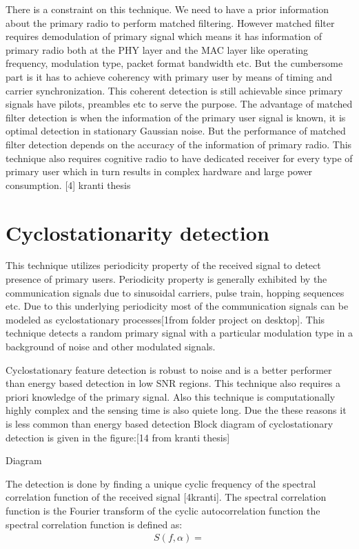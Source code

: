 There is a constraint on this technique. We need to have a prior information 
about the primary radio to perform matched filtering. However matched filter 
requires demodulation of primary signal which means it has information of 
primary radio both at the PHY layer and the MAC layer like operating frequency, 
modulation type, packet format bandwidth etc. But the cumbersome part is it has 
to achieve coherency with primary user by means of timing and carrier 
synchronization. This coherent detection is still achievable since primary 
signals have pilots, preambles etc to serve the purpose. 
The advantage of matched filter detection is when the information of the primary
user signal is known, it is optimal detection in stationary Gaussian noise. But 
the performance of matched filter detection depends on the accuracy of the 
information of primary radio. This technique also requires cognitive radio to 
have dedicated receiver for every type of primary user which in turn results in 
complex hardware and large power consumption. [4] kranti thesis

\section{Cyclostationarity detection}

This technique utilizes periodicity property of the received signal to detect 
presence of primary users. Periodicity property is generally exhibited by the 
communication signals due to sinusoidal carriers, pulse train, hopping sequences
etc. Due to this underlying periodicity most of the communication signals can be
modeled as cyclostationary processes[1from folder project on desktop]. This 
technique detects a random primary signal with a particular modulation type in a
background of noise and other modulated signals.

Cyclostationary feature detection is robust to noise and is a better performer 
than energy based detection in low SNR regions. This technique also requires a 
priori knowledge of the primary signal. Also this technique is computationally 
highly complex and the sensing time is also quiete long. Due the these reasons 
it is less common than energy based detection
Block diagram of cyclostationary detection is given in the figure:[14 from 
kranti thesis]


Diagram 

The detection is done by finding a unique cyclic frequency of the spectral 
correlation function of the received signal [4kranti]. The spectral correlation 
function is the Fourier transform of the cyclic autocorrelation function the 
spectral correlation function is defined as:
\begin{align}
                                        S(f,\alpha)=
\end{align}

